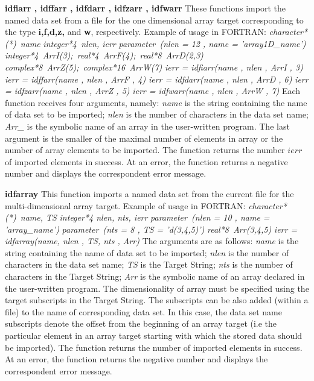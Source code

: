 {
{\bf idfiarr , idffarr , idfdarr , idfzarr ,
idfwarr}\hfil\break
These functions import the named data set from a file 
for the one dimensional array target 
corresponding to the type {\bf i,f,d,z,} and {\bf w}, respectively. 
Example of usage in FORTRAN:\hfil\break
{\it character*(*)\ name}\hfil\break
{\it integer*4\ nlen, ierr}\hfil\break
{\it parameter\ (nlen = 12 , name = 'array1D\_name')}\hfil\break
{\it integer*4\ ArrI(3);\ real*4\ ArrF(4);\ real*8\ ArrD(2,3)}\hfil\break
{\it complex*8\ ArrZ(5);\ complex*16\ ArrW(7)}\hfil\break
{\it ierr = idfiarr(name , nlen , ArrI , 3)}\hfil\break
{\it ierr = idffarr(name , nlen , ArrF , 4)}\hfil\break
{\it ierr = idfdarr(name , nlen , ArrD , 6)}\hfil\break
{\it ierr = idfzarr(name , nlen , ArrZ , 5)}\hfil\break
{\it ierr = idfwarr(name , nlen , ArrW , 7)}\hfil\break
Each function receives four arguments, namely:
{\it name} is the string containing the name of data set to be imported;
{\it nlen} is the number of characters in the data set name;
{\it Arr\_} is the symbolic name of an array in the user-written program.
The last argument is the smaller of the maximal number of elements in array
or the number of array elements to be imported.
The function returns the number $ierr$ of imported elements in success.
At an error, the function returns a negative number
and displays the correspondent error message.
}
\newpage

{
{\bf idfarray}\hfil\break
This function imports a named data set from the current file 
for the multi-dimensional array target.
Example of usage in FORTRAN:\hfil\break
{\it character*(*)\ name, TS}\hfil\break
{\it integer*4 nlen, nts, ierr}\hfil\break
{\it parameter\ (nlen = 10 , name = 'array\_name')}\hfil\break
{\it parameter\ (nts = 8 , TS = 'd(3,4,5)')}\hfil\break
{\it real*8\ Arr(3,4,5)}\hfil\break
{\it ierr = idfarray(name, nlen , TS, nts , Arr)}\hfil\break
The arguments are as follows: 
{\it name} is the string containing 
the name of data set to be imported;
{\it nlen} is the number of characters in the data set name;
{\it TS} is the Target String;
{\it nts} is the number of characters in the Target String;
{\it Arr} is the symbolic name of an array 
declared in the user-written program.
The dimensionality of array must be specified 
using the target subscripts in the Target String. 
The subscripts can be also added (within a file) to the name 
of corresponding data set. In this case, the data set name
subscripts denote the offset from the beginning
of an array target
(i.e the particular element in an array target starting with which
the stored data should be imported).
The function returns the number of imported elements in success.
At an error, the function returns the negative number 
and displays the correspondent error message.
}
\newpage

